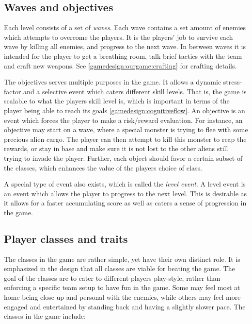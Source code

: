 \subsection{Waves and objectives}\label{gamedesign:ourgame:objectives}
Each level consists of a set of \emph{waves}. Each wave contains a set amount of enemies which attempts to overcome the players. It is the players' job to survive each wave by killing all enemies, and progress to the next wave. In between waves it is intended for the player to get a breathing room, talk brief tactics with the team and craft new weapons. See \ref{gamedesign:ourgame:crafting} for crafting details. 

The objectives serves multiple purposes in the game. It allows a dynamic stress-factor and a selective event which caters different skill levels. 
That is, the game is scalable to what the players skill level is, which is important in terms of the player being able to reach its goals \ref{gamedesign:cognitiveflow}. 
An objective is an event which forces the player to make a risk/reward evaluation. 
For instance, an objective may start on a wave, where a special monster is trying to flee with some precious alien cargo. 
The player can then attempt to kill this monster to reap the rewards, or stay in base and make sure it is not lost to the other aliens still trying to invade the player.
Further, each object should favor a certain subset of the classes, which enhances the value of the players choice of class.

A special type of event also exists, which is called the \emph{level event}. A level event is an event which allows the player to progress to the next level. This is desirable as it allows for a faster accumulating score as well as caters a sense of progression in the game.\\

\subsection{Player classes and traits}\label{gamedesign:ourgame:classes}
The classes in the game are rather simple, yet have their own distinct role.
It is emphasized in the design that all classes are viable for beating the game.
The goal of the classes are to cater to different players play-style, rather than enforcing a specific team setup to have fun in the game.
Some may feel most at home being close up and personal with the enemies, while others may feel more engaged and entertained by standing back and having a slightly slower pace.
The classes in the game include:

